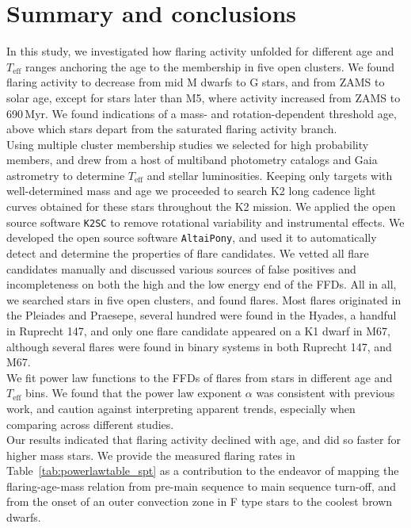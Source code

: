 \documentclass{aa}
\begin{document}
\section{Summary and conclusions}
\label{sec:summary}
In this study, we investigated how flaring activity unfolded for different age and $T_\mathrm{eff}$ ranges anchoring the age to the membership in five open clusters. We found flaring activity to decrease from mid M dwarfs to G stars, and from ZAMS to solar age, except for stars later than M5, where activity increased from ZAMS to 690\,Myr. We found indications of a mass- and rotation-dependent threshold age, above which stars depart from the saturated flaring activity branch.
\\
Using multiple cluster membership studies we selected for high probability members, and drew from a host of multiband photometry catalogs and Gaia astrometry to determine $T_\mathrm{eff}$ and stellar luminosities. Keeping only targets with well-determined mass and age we proceeded to search K2 long cadence light curves obtained for these stars throughout the K2 mission. We applied the open source software \texttt{K2SC} to remove rotational variability and instrumental effects. We developed the open source software \texttt{AltaiPony}, and used it to automatically detect and determine the properties of flare candidates. We vetted all flare candidates manually and discussed various sources of false positives and incompleteness on both the high and the low energy end of the FFDs. All in all, we searched stars in five open clusters, and found flares. Most flares originated in the Pleiades and Praesepe, several hundred were found in the Hyades, a handful in Ruprecht 147, and only one flare candidate appeared on a K1 dwarf in M67, although several flares were found in binary systems in both Ruprecht 147, and M67.
\\
We fit power law functions to the FFDs of flares from stars in different age and $T_\mathrm{eff}$ bins. We found that the power law exponent $\alpha$ was consistent with previous work, and caution against interpreting apparent trends, especially when comparing across different studies.
\\
Our results indicated that flaring activity declined with age, and did so faster for higher mass stars. We provide the measured flaring rates in Table~\ref{tab:powerlawtable_spt} as a contribution to the endeavor of mapping the flaring-age-mass relation from pre-main sequence to main sequence turn-off, and from the onset of an outer convection zone in F type stars to the coolest brown dwarfs.
\end{document}
